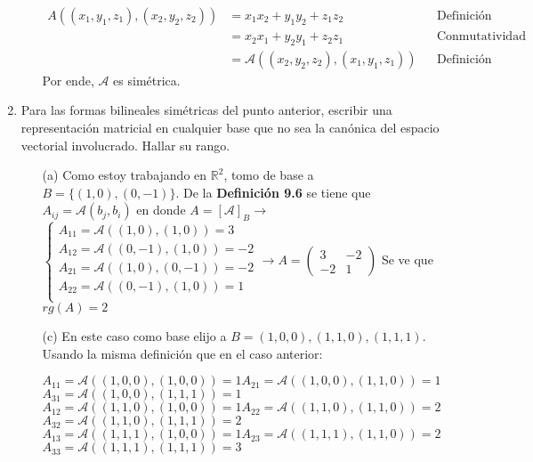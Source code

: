 \documentclass{article}
\newcommand{\R}{\mathbb{R}}
\newcommand{\A}{\mathcal{A}}
\begin{document}
\begin{enumerate}
\begin{enumerate}
\begin{align*}
                        A((x_1,y_1,z_1),(x_2,y_2,z_2))&=x_1x_2+y_1y_2+z_1z_2&&\text{Definición}\\
                        &=x_2x_1+y_2y_1+z_2z_1&&\text{Conmutatividad}\\
                        &=\A((x_2,y_2,z_2),(x_1,y_1,z_1))&&\text{Definición}
                    \end{align*}
                    Por ende, $\A$ es simétrica.
            \end{enumerate}
        \item Para las formas bilineales simétricas del punto anterior, escribir una representación matricial en cualquier base que no sea la canónica del espacio vectorial involucrado. Hallar su rango.
            \begin{itemize}
                \item[(a)] Como estoy trabajando en $\R^2$, tomo de base a $B=\{(1,0),(0,-1)\}$. De la \textbf{Definición 9.6} se tiene que $A_{ij}=\A(b_j,b_i)$ en donde $A=[\A]_B\to$
                    $\begin{cases} 
                        A_{11}=\A((1,0),(1,0))=3 \\
                        A_{12}=\A((0,-1),(1,0))=-2 \\
                        A_{21}=\A((1,0),(0,-1))=-2 \\
                        A_{22}=\A((0,-1),(1,0))=1 \\
                    \end{cases}
                    \to A=\begin{pmatrix}
                        3 & -2 \\
                        -2 & 1 
                    \end{pmatrix}$
                    \quad Se ve que $rg(A)=2$
                \item[(c)] En este caso como base elijo a $B={(1,0,0),(1,1,0),(1,1,1)}$. Usando la misma definición que en el caso anterior:
                    \begin{center}
                        $A_{11}=\A((1,0,0),(1,0,0))=1$\quad$A_{21}=\A((1,0,0),(1,1,0))=1$\quad$A_{31}=\A((1,0,0),(1,1,1))=1$\\
                        $A_{12}=\A((1,1,0),(1,0,0))=1$\quad$A_{22}=\A((1,1,0),(1,1,0))=2$\quad$A_{32}=\A((1,1,0),(1,1,1))=2$\\
                        $A_{13}=\A((1,1,1),(1,0,0))=1$\quad$A_{23}=\A((1,1,1),(1,1,0))=2$\quad$A_{33}=\A((1,1,1),(1,1,1))=3$\\

\end{center}
\end{itemize}
\end{enumerate}
\end{document}
